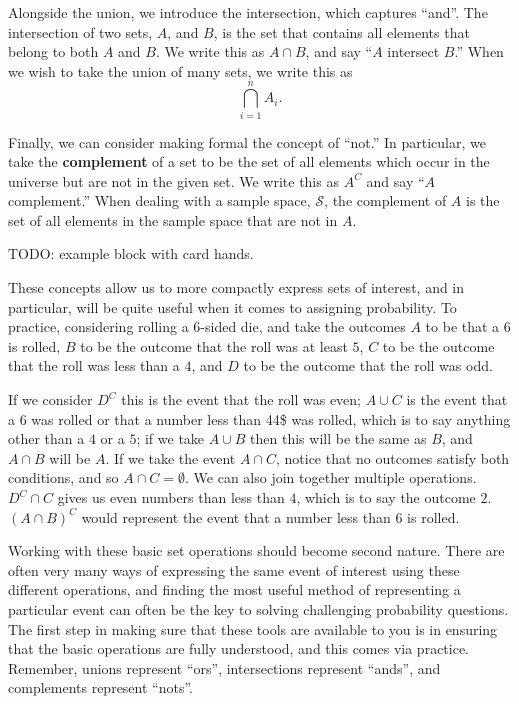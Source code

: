 \documentclass[
  letterpaper,
  DIV=11,
  numbers=noendperiod]{scrreprt}
\begin{document}
Alongside the union, we introduce the intersection, which captures
``and''. The intersection of two sets, \(A\), and \(B\), is the set that
contains all elements that belong to both \(A\) and \(B\). We write this
as \(A \cap B\), and say ``\(A\) intersect \(B\).'' When we wish to take
the union of many sets, we write this as \[\bigcap_{i=1}^n A_i.\]

Finally, we can consider making formal the concept of ``not.'' In
particular, we take the \textbf{complement} of a set to be the set of
all elements which occur in the universe but are not in the given set.
We write this as \(A^C\) and say ``\(A\) complement.'' When dealing with
a sample space, \(\mathcal{S}\), the complement of \(A\) is the set of
all elements in the sample space that are not in \(A\).

TODO: example block with card hands.

These concepts allow us to more compactly express sets of interest, and
in particular, will be quite useful when it comes to assigning
probability. To practice, considering rolling a 6-sided die, and take
the outcomes \(A\) to be that a \(6\) is rolled, \(B\) to be the outcome
that the roll was at least \(5\), \(C\) to be the outcome that the roll
was less than a \(4\), and \(D\) to be the outcome that the roll was
odd.

If we consider \(D^C\) this is the event that the roll was even;
\(A \cup C\) is the event that a \(6\) was rolled or that a number less
than 44\$ was rolled, which is to say anything other than a \(4\) or a
\(5\); if we take \(A \cup B\) then this will be the same as \(B\), and
\(A\cap B\) will be \(A\). If we take the event \(A\cap C\), notice that
no outcomes satisfy both conditions, and so \(A \cap C = \emptyset\). We
can also join together multiple operations. \(D^C \cap C\) gives us even
numbers than less than \(4\), which is to say the outcome \(2\).
\((A \cap B)^C\) would represent the event that a number less than \(6\)
is rolled.

Working with these basic set operations should become second nature.
There are often very many ways of expressing the same event of interest
using these different operations, and finding the most useful method of
representing a particular event can often be the key to solving
challenging probability questions. The first step in making sure that
these tools are available to you is in ensuring that the basic
operations are fully understood, and this comes via practice. Remember,
unions represent ``ors'', intersections represent ``ands'', and
complements represent ``nots''.
\end{document}
